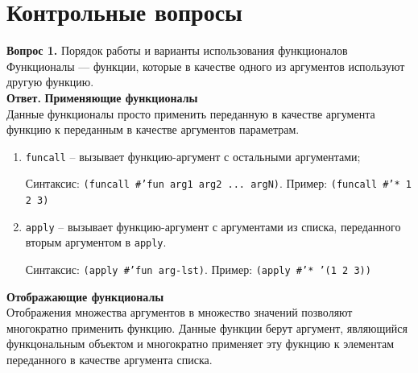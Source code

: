 \documentclass[12pt]{report}
\begin{document}
\section*{Контрольные вопросы}
\textbf{Вопрос 1.} Порядок работы и варианты использования функционалов\\

Функционалы --- функции, которые в качестве одного из аргументов используют другую функцию.\\

\indent\textbf{Ответ.} \textbf{Применяющие функционалы}\\

Данные функционалы просто применить переданную в качестве аргумента функцию к переданным в качестве аргументов параметрам.

\begin{enumerate}
	\item \texttt{funcall} -- вызывает функцию-аргумент с остальными аргументами;
	
	Синтаксис: \texttt{(funcall \#'fun arg1 arg2 ... argN)}.
	Пример: \texttt{(funcall \#'* 1 2 3)}
	
	\item \texttt{apply} -- вызывает функцию-аргумент с аргументами из списка, переданного вторым аргументом в \texttt{apply}.
	
	Синтаксис: \texttt{(apply \#'fun arg-lst)}.
	Пример: \texttt{(apply \#'* '(1 2 3))}
\end{enumerate}

\textbf{Отображающие функционалы}\\

Отображения множества аргументов в множество значений позволяют многократно применить функцию. Данные функции берут аргумент, являющийся функцональным объектом и многократно применяет эту фукнцию к элементам переданного в качестве аргумента списка.
\end{document}
